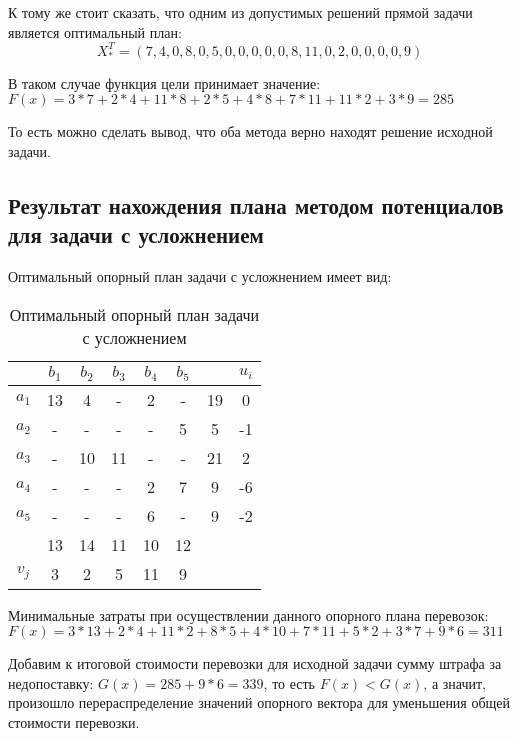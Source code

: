 \documentclass[../body.tex]{subfiles}
\begin{document}
К тому же стоит сказать, что одним из допустимых решений прямой задачи является оптимальный план:
\begin{equation}
    X_*^T=(7,4,0,8,0,5,0,0,0,0,0,8,11,0,2,0,0,0,0,9)
\end{equation}

В таком случае функция цели принимает значение: $F(x)=3*7+2*4+11*8+2*5+4*8+7*11+11*2+3*9=285$

То есть можно сделать вывод, что оба метода верно находят решение исходной задачи.

\subsection{Результат нахождения плана методом потенциалов для задачи с усложнением}
Оптимальный опорный план задачи с усложнением имеет вид:
\begin{table}[h]
    \centering
    \begin{tabular}{|c|c|c|c|c|c||c||c|}
        \hline
        & $b_1$ & $b_2$ & $b_3$ & $b_4$ & $b_5$ & & $u_i$ \\\hline
        $a_1$ & 13 & 4 & - & 2 & - & 19 & 0\\\hline
        $a_2$ & - & - & - & - & 5 & 5 & -1\\\hline
        $a_3$ & - & 10 & 11 & - & - & 21 & 2\\\hline
        $a_4$ & - & - & - & 2 & 7 & 9 & -6\\\hline
        $a_5$ & - & - & - & 6 & - & 9 & -2\\\hline
        & 13 & 14 & 11 & 10 & 12 & &\\\hline
        \hline
        $v_j$ & 3 & 2 & 5 & 11 & 9 & &\\\hline
    \end{tabular}
    \caption{Оптимальный опорный план задачи с усложнением}
    \label{tab:potentials}
\end{table}

Минимальные затраты при осуществлении данного опорного плана перевозок: $F(x)=3*13+2*4+11*2+8*5+4*10+7*11+5*2+3*7+9*6=311$

Добавим к итоговой стоимости перевозки для исходной задачи сумму штрафа за недопоставку: $G(x)=285+9*6=339$, то есть $F(x) < G(x)$, а значит, произошло перераспределение значений опорного вектора для уменьшения общей стоимости перевозки.
\end{document}
